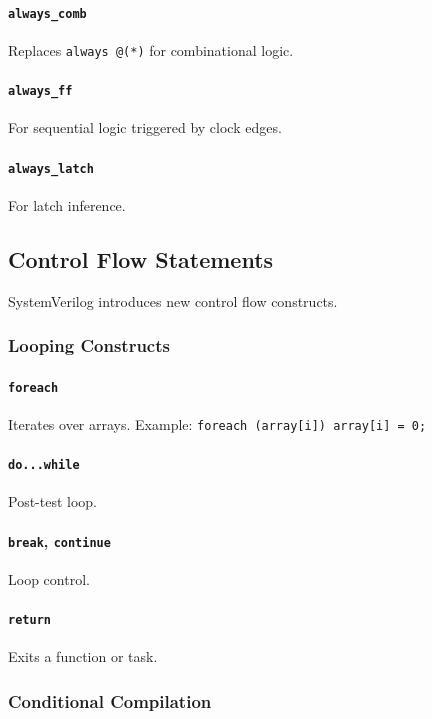 \paragraph{\texttt{always\_comb}} Replaces \texttt{always @(*)} for combinational logic.

\paragraph{\texttt{always\_ff}} For sequential logic triggered by clock edges.

\paragraph{\texttt{always\_latch}} For latch inference.

\subsection{Control Flow Statements}
SystemVerilog introduces new control flow constructs.

\subsubsection{Looping Constructs}
\paragraph{\texttt{foreach}} Iterates over arrays. Example: \texttt{foreach (array[i]) array[i] = 0;}

\paragraph{\texttt{do...while}} Post-test loop.

\paragraph{\texttt{break}, \texttt{continue}} Loop control.

\paragraph{\texttt{return}} Exits a function or task.

\subsubsection{Conditional Compilation}
